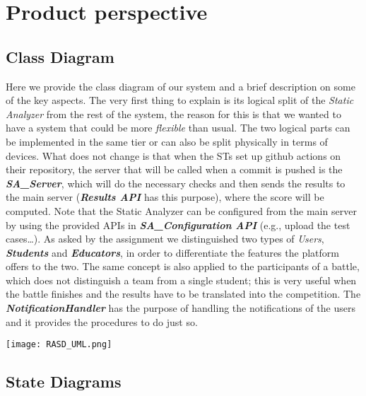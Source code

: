 \section{Product perspective}
\label{s:Product_perspective}%

\subsection{Class Diagram}
\label{ss:class_diagram}%
Here we provide the class diagram of our system and a brief description on some of the key aspects. The very first thing to explain is its logical split of the \textit{Static Analyzer} from the rest of the system, the reason for this is that we wanted to have a system that could be more \textit{flexible} than usual. The two logical parts can be implemented in the same tier or can also be split physically in terms of devices. What does not change is that when the STs set up github actions on their repository, the server that will be called when a commit is pushed is the \textbf{\textit{SA\_Server}}, which will do the necessary checks and then sends the results to the main server (\textbf{\textit{Results API}} has this purpose), where the score will be computed. Note that the Static Analyzer can be configured from the main server by using the provided APIs in \textbf{\textit{SA\_Configuration API}} (e.g., upload the test cases…). 
As asked by the assignment we distinguished two types of \textit{Users}, \textbf{\textit{Students}} and \textbf{\textit{Educators}}, in order to differentiate the features the platform offers to the two. The same concept is also applied to the participants of a battle, which does not distinguish a team from a single student; this is very useful when the battle finishes and the results have to be translated into the competition. The \textbf{\textit{NotificationHandler}} has the purpose of handling the notifications of the users and it provides the procedures to do just so.

\begin{center}
  \texttt{[image: RASD\_UML.png]}
\end{center}

\subsection{State Diagrams}
\label{ss:state_diagrams}%

